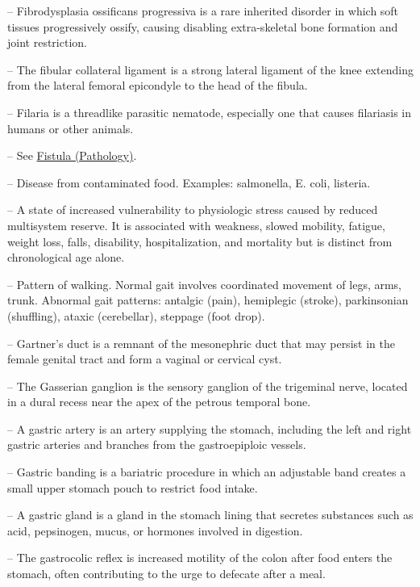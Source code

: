 -- Fibrodysplasia ossificans progressiva is a rare inherited disorder in which soft tissues progressively ossify, causing disabling extra-skeletal bone formation and joint restriction.

-- The fibular collateral ligament is a strong lateral ligament of the knee extending from the lateral femoral epicondyle to the head of the fibula.

-- Filaria is a threadlike parasitic nematode, especially one that causes filariasis in humans or other animals.

-- See \hyperlink{Fistula (Pathology)}{Fistula (Pathology)}.

-- Disease from contaminated food. Examples: salmonella, E. coli, listeria.

-- A state of increased vulnerability to physiologic stress caused by reduced multisystem reserve. It is associated with weakness, slowed mobility, fatigue, weight loss, falls, disability, hospitalization, and mortality but is distinct from chronological age alone.

-- Pattern of walking. Normal gait involves coordinated movement of legs, arms, trunk. Abnormal gait patterns: antalgic (pain), hemiplegic (stroke), parkinsonian (shuffling), ataxic (cerebellar), steppage (foot drop).

-- Gartner's duct is a remnant of the mesonephric duct that may persist in the female genital tract and form a vaginal or cervical cyst.

-- The Gasserian ganglion is the sensory ganglion of the trigeminal nerve, located in a dural recess near the apex of the petrous temporal bone.

-- A gastric artery is an artery supplying the stomach, including the left and right gastric arteries and branches from the gastroepiploic vessels.

-- Gastric banding is a bariatric procedure in which an adjustable band creates a small upper stomach pouch to restrict food intake.

-- A gastric gland is a gland in the stomach lining that secretes substances such as acid, pepsinogen, mucus, or hormones involved in digestion.

-- The gastrocolic reflex is increased motility of the colon after food enters the stomach, often contributing to the urge to defecate after a meal.

